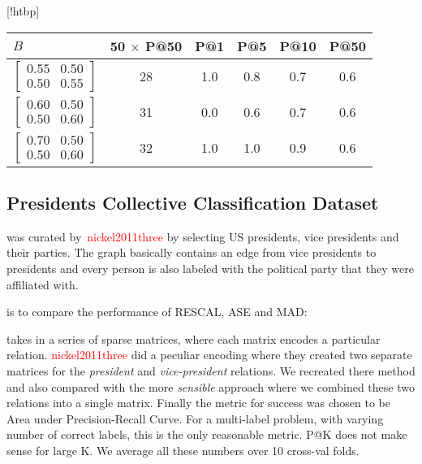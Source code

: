 \documentclass{tufte-handout}
\makeatletter
\renewcommand{\cite}[1]{\textcolor{red}{#1}}
\renewenvironment{table}[1][htbp]{%
\@tufte@orig@float{table}[#1]}{%
\@tufte@orig@endfloat}%
\makeatother
\begin{document}
\begin{table}[!htbp]
  \begin{tabular}{l c c c c c}
    $B$ & 50 $\times$ P@50 & P@1 & P@5 & P@10 & P@50 \\ \toprule
  $\begin{bmatrix} 0.55 & 0.50 \\0.50 &0.55 \end{bmatrix}$ & 28 & 1.0 & 0.8 & 0.7 & 0.6 \\
  $\begin{bmatrix} 0.60 & 0.50 \\0.50 &0.60 \end{bmatrix}$ & 31 & 0.0 & 0.6 & 0.7 & 0.6 \\
  $\begin{bmatrix} 0.70 & 0.50 \\0.50 &0.60 \end{bmatrix}$ & 32 & 1.0 & 1.0 & 0.9 & 0.6 \\
  \end{tabular}
  \caption{Performance vs B Matrix. MAD Algorithm. Seed=1234, Undirected, Training Size=20}
  \label{tab:perf-vs-b-7}
\end{table}

\pagebreak
\subsection{Presidents Collective Classification Dataset}
\label{sec:pres-coll-class}
 was
curated by~\cite{nickel2011three} by selecting US presidents, vice
presidents and their parties. The graph basically contains an edge
from vice presidents to presidents and every person is also labeled with
the political party that they were affiliated with.

 is to compare the performance of
RESCAL, ASE and MAD:

 takes in a series of sparse matrices, where each
matrix encodes a particular relation. \cite{nickel2011three} did a peculiar encoding
where they created two separate matrices for the \textit{president} and
\textit{vice-president} relations. We recreated there method and also compared with
the more \textit{sensible} approach where we combined these two relations into
a single matrix. Finally the metric for success was chosen to be Area under Precision-Recall
Curve. For a multi-label problem, with varying number of correct labels, this is the only reasonable metric.
P@K does not make sense for large K. We average all these numbers over 10 cross-val folds.
\end{document}
